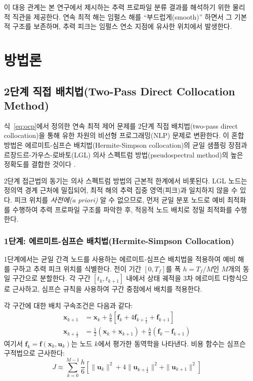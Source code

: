 \documentclass[a4paper,fleqn]{cas-dc}
\let\origsubsection\subsection
\renewcommand{\subsection}{\FloatBarrier\origsubsection}
\begin{document}
이 대응 관계는 본 연구에서 제시하는 추력 프로파일 분류 결과를 해석하기 위한 물리적 직관을 제공한다. 연속 최적 해는 임펄스 해를 ``부드럽게(smooth)'' 하면서 그 기본적 구조를 보존하며, 추력 피크는 임펄스 연소 지점에 유사한 위치에서 발생한다.


\section{방법론}\label{sec:methodology}

\subsection{2단계 직접 배치법(Two-Pass Direct Collocation Method)}\label{subsec:direct_collocation}

식~\eqref{eq:ocp}에서 정의한 연속 최적 제어 문제를 2단계 직접 배치법(two-pass direct collocation)을 통해 유한 차원의 비선형 프로그래밍(NLP) 문제로 변환한다. 이 혼합 방법은 에르미트-심프슨 배치법(Hermite-Simpson collocation)의 균일 샘플링 장점과 르장드르-가우스-로바토(LGL) 의사 스펙트럼 방법(pseudospectral method)의 높은 정확도를 결합한 것이다 \citep{Hargraves1987,Rao2025,Fahroo2002}.

2단계 접근법의 동기는 의사 스펙트럼 방법의 근본적 한계에서 비롯된다. LGL 노드는 정의역 경계 근처에 밀집되어, 최적 해의 추력 집중 영역(피크)과 일치하지 않을 수 있다. 피크 위치를 \textit{사전에(a priori)} 알 수 없으므로, 먼저 균일 분포 노드로 예비 최적화를 수행하여 추력 프로파일 구조를 파악한 후, 적응적 노드 배치로 정밀 최적화를 수행한다.

\subsubsection{1단계: 에르미트-심프슨 배치법(Hermite-Simpson Collocation)}

1단계에서는 균일 간격 노드를 사용하는 에르미트-심프슨 배치법을 적용하여 예비 해를 구하고 추력 피크 위치를 식별한다. 전이 기간 $[0, T_f]$를 폭 $h = T_f/M$인 $M$개의 동일 구간으로 분할한다. 각 구간 $[t_k, t_{k+1}]$ 내에서 상태 궤적을 3차 에르미트 다항식으로 근사하고, 심프슨 규칙을 사용하여 구간 중점에서 배치를 적용한다.

각 구간에 대한 배치 구속조건은 다음과 같다:
\begin{align}
\mathbf{x}_{k+1} &= \mathbf{x}_k + \frac{h}{6}\left[\mathbf{f}_k + 4\mathbf{f}_{k+\frac{1}{2}} + \mathbf{f}_{k+1}\right] \label{eq:simpson_continuity} \\
\mathbf{x}_{k+\frac{1}{2}} &= \frac{1}{2}(\mathbf{x}_k + \mathbf{x}_{k+1}) + \frac{h}{8}(\mathbf{f}_k - \mathbf{f}_{k+1}) \label{eq:hermite_midpoint}
\end{align}
여기서 $\mathbf{f}_k = \mathbf{f}(\mathbf{x}_k, \mathbf{u}_k)$는 노드 $k$에서 평가한 동역학을 나타낸다. 비용 함수는 심프슨 구적법으로 근사한다:
\begin{equation}
J \approx \sum_{k=0}^{M-1} \frac{h}{6}\left[\|\mathbf{u}_k\|^2 + 4\|\mathbf{u}_{k+\frac{1}{2}}\|^2 + \|\mathbf{u}_{k+1}\|^2\right]
\end{equation}
\end{document}
